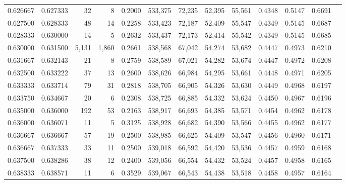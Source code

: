 \begin{tabular}{rrrrrrrrrrrrr}
0.626667 & 0.627333 &     32 &     8 &                                     0.2000 & 533,375 &  72,235 &  52,395 &  55,561 & 0.4348 & 0.5147 & 0.6691 \\
0.627500 & 0.628333 &     48 &    14 &                                     0.2258 & 533,423 &  72,187 &  52,409 &  55,547 & 0.4349 & 0.5145 & 0.6687 \\
0.628333 & 0.630000 &     14 &     5 &                                     0.2632 & 533,437 &  72,173 &  52,414 &  55,542 & 0.4349 & 0.5145 & 0.6685 \\
0.630000 & 0.631500 &  5,131 & 1,860 &                                     0.2661 & 538,568 &  67,042 &  54,274 &  53,682 & 0.4447 & 0.4973 & 0.6210 \\
0.631667 & 0.632143 &     21 &     8 &                                     0.2759 & 538,589 &  67,021 &  54,282 &  53,674 & 0.4447 & 0.4972 & 0.6208 \\
0.632500 & 0.633222 &     37 &    13 &                                     0.2600 & 538,626 &  66,984 &  54,295 &  53,661 & 0.4448 & 0.4971 & 0.6205 \\
0.633333 & 0.633714 &     79 &    31 &                                     0.2818 & 538,705 &  66,905 &  54,326 &  53,630 & 0.4449 & 0.4968 & 0.6197 \\
0.633750 & 0.634667 &     20 &     6 &                                     0.2308 & 538,725 &  66,885 &  54,332 &  53,624 & 0.4450 & 0.4967 & 0.6196 \\
0.635000 & 0.636000 &    192 &    53 &                                     0.2163 & 538,917 &  66,693 &  54,385 &  53,571 & 0.4454 & 0.4962 & 0.6178 \\
0.636000 & 0.636071 &     11 &     5 &                                     0.3125 & 538,928 &  66,682 &  54,390 &  53,566 & 0.4455 & 0.4962 & 0.6177 \\
0.636667 & 0.636667 &     57 &    19 &                                     0.2500 & 538,985 &  66,625 &  54,409 &  53,547 & 0.4456 & 0.4960 & 0.6171 \\
0.636667 & 0.637333 &     33 &    11 &                                     0.2500 & 539,018 &  66,592 &  54,420 &  53,536 & 0.4457 & 0.4959 & 0.6168 \\
0.637500 & 0.638286 &     38 &    12 &                                     0.2400 & 539,056 &  66,554 &  54,432 &  53,524 & 0.4457 & 0.4958 & 0.6165 \\
0.638333 & 0.638571 &     11 &     6 &                                     0.3529 & 539,067 &  66,543 &  54,438 &  53,518 & 0.4458 & 0.4957 & 0.6164 \\

\end{tabular}
